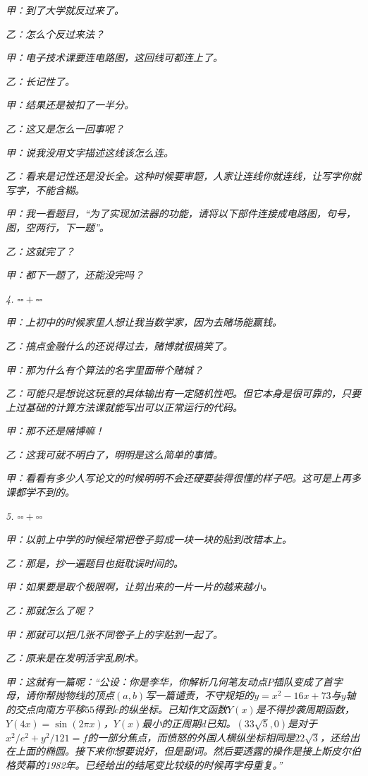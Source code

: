 \documentclass[11pt,a4paper,onecolumn,UTF8]{ctexart}
\begin{document}
	\textit{甲：到了大学就反过来了。}
	
	\textit{乙：怎么个反过来法？}
	
	\textit{甲：电子技术课要连电路图，这回线可都连上了。}
	
	\textit{乙：长记性了。}
	
	\textit{甲：结果还是被扣了一半分。}
	
	\textit{乙：这又是怎么一回事呢？}
	
	\textit{甲：说我没用文字描述这线该怎么连。}
	
	\textit{乙：看来是记性还是没长全。这种时候要审题，人家让连线你就连线，让写字你就写字，不能含糊。}
	
	\textit{甲：我一看题目，“为了实现加法器的功能，请将以下部件连接成电路图，句号，图，空两行，下一题”。}
	
	\textit{乙：这就完了？}
	
	\textit{甲：都下一题了，还能没完吗？}
	
	\textit{4. $\square\square+\square\square$}
	
	\textit{甲：上初中的时候家里人想让我当数学家，因为去赌场能赢钱。}
	
	\textit{乙：搞点金融什么的还说得过去，赌博就很搞笑了。}
	
	\textit{甲：那为什么有个算法的名字里面带个赌城？\faMapMarker}
	
	\textit{乙：可能只是想说这玩意的具体输出有一定随机性吧。但它本身是很可靠的，只要上过基础的计算方法课就能写出可以正常运行的代码。}
	
	\textit{甲：那不还是赌博嘛！}
	
	\textit{乙：这我可就不明白了，明明是这么简单的事情。}
	
	\textit{甲：看看有多少人写论文的时候明明不会还硬要装得很懂的样子吧。这可是上再多课都学不到的。}
	
	\textit{5. $\square\square+\square\square$}
	
	\textit{甲：以前上中学的时候经常把卷子剪成一块一块的贴到改错本上。}
	
	\textit{乙：那是，抄一遍题目也挺耽误时间的。}
	
	\textit{甲：如果要是取个极限啊，让剪出来的一片一片的越来越小。}
	
	\textit{乙：那就怎么了呢？}
	
	\textit{甲：那就可以把几张不同卷子上的字贴到一起了。}
	
	\textit{乙：原来是在发明活字乱刷术。}
	
	\textit{甲：这就有一篇呢：“公设：你是李华，你解析几何笔友动点$P$插队变成了首字母，请你帮抛物线的顶点$(a,b)$写一篇谴责，不守规矩的$y=x^2-16x+73$与$y$轴的交点向南方平移$55$得到$c$的纵坐标。已知作文函数$Y(x)$是不得抄袭周期函数，$Y(4x)=\sin(2\pi x)$，$Y(x)$最小的正周期$d$已知。$(33\sqrt{5},0)$是对于$x^2/e^2+y^2/121=f$的一部分焦点，而愤怒的外国人横纵坐标相同是$22\sqrt{3}$，还给出在上面的椭圆。接下来你想要说好，但是副词。然后要透露的操作是接上斯皮尔伯格荧幕的1982年。已经给出的结尾变比较级的时候再字母重复。”}
	
\end{document}
